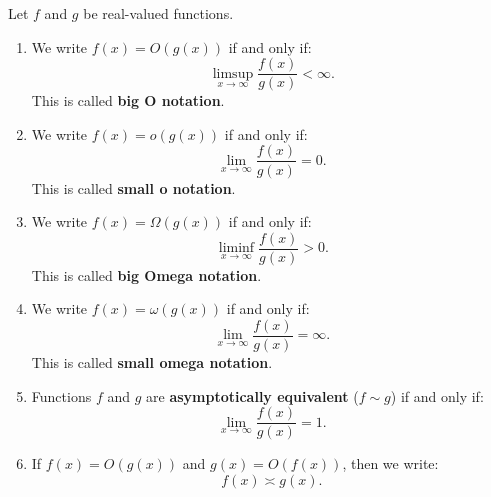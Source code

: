 \documentclass{huhtakm-template-book-v2}
\begin{document}
    \begin{defn}
        Let $f$ and $g$ be real-valued functions.
        \begin{enumerate}
            \item We write $f(x) = O(g(x))$ if and only if:
            \begin{equation*}
                \limsup_{x \to \infty}\frac{f(x)}{g(x)} < \infty.
            \end{equation*}
            This is called \textbf{big O notation}.
            \item We write $f(x) = o(g(x))$ if and only if:
            \begin{equation*}
                \lim_{x \to \infty}\frac{f(x)}{g(x)} = 0.
            \end{equation*}
            This is called \textbf{small o notation}.
            \item We write $f(x) = \Omega(g(x))$ if and only if:
            \begin{equation*}
                \liminf_{x \to \infty}\frac{f(x)}{g(x)} > 0.
            \end{equation*}
            This is called \textbf{big Omega notation}.
            \item We write $f(x) = \omega(g(x))$ if and only if:
            \begin{equation*}
                \lim_{x \to \infty}\frac{f(x)}{g(x)} = \infty.
            \end{equation*}
            This is called \textbf{small omega notation}.
            \item Functions $f$ and $g$ are \textbf{asymptotically equivalent} ($f \sim g$) if and only if:
            \begin{equation*}
                \lim_{x \to \infty}\frac{f(x)}{g(x)} = 1.
            \end{equation*}
            \item If $f(x) = O(g(x))$ and $g(x) = O(f(x))$, then we write:
            \begin{equation*}
                f(x)\asymp g(x).
            \end{equation*}
        \end{enumerate}
    \end{defn}
\end{document}

